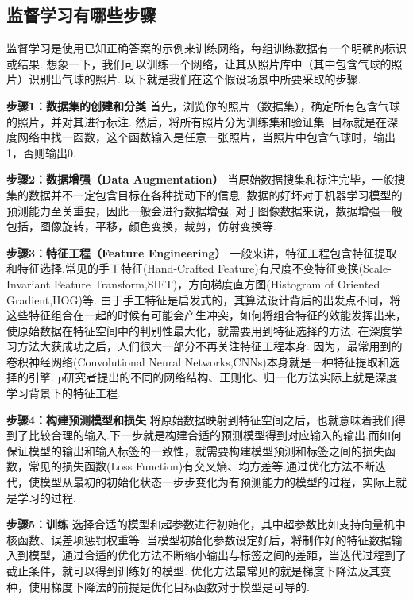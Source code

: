 \subsection{监督学习有哪些步骤}
\label{ux76d1ux7763ux5b66ux4e60ux6709ux54eaux4e9bux6b65ux9aa4}

监督学习是使用已知正确答案的示例来训练网络，每组训练数据有一个明确的标识或结果.
想象一下，我们可以训练一个网络，让其从照片库中（其中包含气球的照片）识别出气球的照片.
以下就是我们在这个假设场景中所要采取的步骤.

\textbf{步骤1：数据集的创建和分类} ​
首先，浏览你的照片（数据集），确定所有包含气球的照片，并对其进行标注.
然后，将所有照片分为训练集和验证集.
目标就是在深度网络中找一函数，这个函数输入是任意一张照片，当照片中包含气球时，输出1，否则输出0.

\textbf{步骤2：数据增强（Data Augmentation）} ​
当原始数据搜集和标注完毕，一般搜集的数据并不一定包含目标在各种扰动下的信息.
数据的好坏对于机器学习模型的预测能力至关重要，因此一般会进行数据增强.
对于图像数据来说，数据增强一般包括，图像旋转，平移，颜色变换，裁剪，仿射变换等.

\textbf{步骤3：特征工程（Feature Engineering）} ​
一般来讲，特征工程包含特征提取和特征选择.常见的手工特征(Hand-Crafted Feature)有尺度不变特征变换(Scale-Invariant Feature Transform,SIFT)，方向梯度直方图(Histogram of Oriented Gradient,HOG)等.
由于手工特征是启发式的，其算法设计背后的出发点不同，将这些特征组合在一起的时候有可能会产生冲突，如何将组合特征的效能发挥出来，使原始数据在特征空间中的判别性最大化，就需要用到特征选择的方法.
在深度学习方法大获成功之后，人们很大一部分不再关注特征工程本身.
因为，最常用到的卷积神经网络(Convolutional Neural Networks,CNNs)本身就是一种特征提取和选择的引擎.
p研究者提出的不同的网络结构、正则化、归一化方法实际上就是深度学习背景下的特征工程.

\textbf{步骤4：构建预测模型和损失} ​
将原始数据映射到特征空间之后，也就意味着我们得到了比较合理的输入.下一步就是构建合适的预测模型得到对应输入的输出.而如何保证模型的输出和输入标签的一致性，就需要构建模型预测和标签之间的损失函数，常见的损失函数(Loss
Function)有交叉熵、均方差等.通过优化方法不断迭代，使模型从最初的初始化状态一步步变化为有预测能力的模型的过程，实际上就是学习的过程.

\textbf{步骤5：训练} ​
选择合适的模型和超参数进行初始化，其中超参数比如支持向量机中核函数、误差项惩罚权重等.
当模型初始化参数设定好后，将制作好的特征数据输入到模型，通过合适的优化方法不断缩小输出与标签之间的差距，当迭代过程到了截止条件，就可以得到训练好的模型.
优化方法最常见的就是梯度下降法及其变种，使用梯度下降法的前提是优化目标函数对于模型是可导的.

